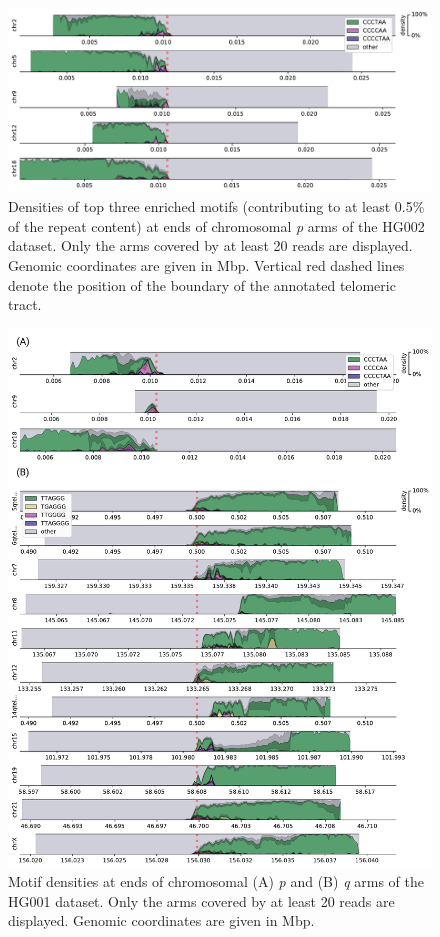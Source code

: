 \documentclass{article}
\begin{document}
\begin{figure}[ht!] \centering
\includegraphics[height=.9\textheight,width=\textwidth,keepaspectratio]{figures/threemotifp/HG002-densityplot-p_arm-threemotifp.pdf}
\caption{
    Densities of top three enriched motifs (contributing to at least 0.5\% of the repeat content) at ends of chromosomal \textit{p} arms of the HG002 dataset.
    Only the arms covered by at least 20 reads are displayed.
    Genomic coordinates are given in Mbp.
    Vertical red dashed lines denote the position of the boundary of the annotated telomeric tract.
}
\label{fig:hg002_densityplot_p_arm}
\end{figure}
\clearpage \pagebreak

\begin{figure}[ht!] \centering
\includegraphics[height=.95\textheight,width=\textwidth,keepaspectratio]{figures/threemotifp/HG001-densityplots-threemotifp.pdf}
\caption{
    Motif densities at ends of chromosomal (A) \textit{p} and (B) \textit{q} arms of the HG001 dataset.
    Only the arms covered by at least 20 reads are displayed.
    Genomic coordinates are given in Mbp.
}
\label{fig:hg001_densityplots}
\end{figure}
\clearpage \pagebreak
\end{document}
